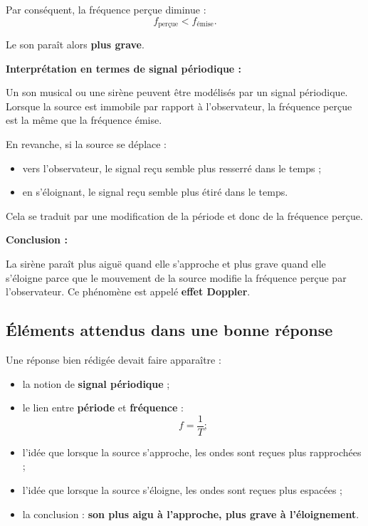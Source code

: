 \documentclass[11pt,a4paper]{article}
\begin{document}
Par conséquent, la fréquence perçue diminue :
\[
f_{\text{perçue}} < f_{\text{émise}}.
\]

Le son paraît alors \textbf{plus grave}.

\medskip

\textbf{Interprétation en termes de signal périodique :}

Un son musical ou une sirène peuvent être modélisés par un signal périodique.  
Lorsque la source est immobile par rapport à l'observateur, la fréquence perçue est la même que la fréquence émise.

En revanche, si la source se déplace :
\begin{itemize}
    \item vers l'observateur, le signal reçu semble plus \og resserré \fg{} dans le temps ;
    \item en s'éloignant, le signal reçu semble plus \og étiré \fg{} dans le temps.
\end{itemize}

Cela se traduit par une modification de la période et donc de la fréquence perçue.

\medskip

\textbf{Conclusion :}

La sirène paraît plus aiguë quand elle s'approche et plus grave quand elle s'éloigne parce que le mouvement de la source modifie la fréquence perçue par l'observateur.  
Ce phénomène est appelé \textbf{effet Doppler}.

\subsection*{Éléments attendus dans une bonne réponse}

Une réponse bien rédigée devait faire apparaître :
\begin{itemize}
    \item la notion de \textbf{signal périodique} ;
    \item le lien entre \textbf{période} et \textbf{fréquence} :
    \[
    f=\frac{1}{T} ;
    \]
    \item l'idée que lorsque la source s'approche, les ondes sont reçues plus rapprochées ;
    \item l'idée que lorsque la source s'éloigne, les ondes sont reçues plus espacées ;
    \item la conclusion : \textbf{son plus aigu à l'approche, plus grave à l'éloignement}.
\end{itemize}
\end{document}

